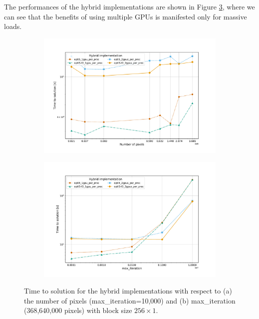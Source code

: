 \documentclass[11pt,a4paper]{article}
\begin{document}
The performances of the hybrid implementations are shown in Figure \ref{fig:hybrid-optis}, where we can see that the benefits of using multiple GPUs is manifested only for massive loads.
\begin{figure}
	\vspace{-0.7cm}
	\centering
	\begin{subfigure}{.5\textwidth}
		\centering
		\includegraphics[width=.99\linewidth, clip, trim={1.5cm 1cm 2.5cm 2cm}]{hybrid-optis-px.pdf}
		\caption{} 
		\label{fig:hybrid-optis-px}
	\end{subfigure}%
	\begin{subfigure}{.5\textwidth}
		\centering
		\includegraphics[width=.99\linewidth, clip, trim={1.5cm 1cm 2.5cm 2cm}]{hybrid-optis-maxiter.pdf}
		\caption{} 
		\label{fig:hybrid-optis-maxiter}
	\end{subfigure}
	\vspace{-0.4cm}
	\caption{Time to solution for the hybrid implementations with respect to (a) the number of pixels (max\_iteration=10,000) and (b) max\_iteration (368,640,000 pixels) with block size $256\times1$.}
	\label{fig:hybrid-optis}

\end{figure}
\end{document}
